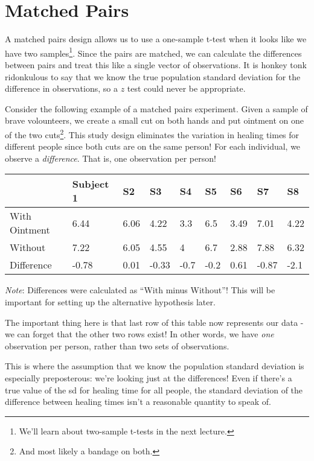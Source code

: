 \documentclass[
  letterpaper,
  DIV=11,
  numbers=noendperiod]{scrreprt}
\begin{document}
\hypertarget{matched-pairs}{%
\section{Matched Pairs}\label{matched-pairs}}

A matched pairs design allows us to use a one-sample t-test when it
looks like we have two samples\footnote{We'll learn about two-sample
  t-tests in the next lecture.}. Since the pairs are matched, we can
calculate the differences between pairs and treat this like a single
vector of observations. It is honkey tonk ridonkulous to say that we
know the true population standard deviation for the difference in
observations, so a \(z\) test could never be appropriate.

Consider the following example of a matched pairs experiment. Given a
sample of brave volounteers, we create a small cut on both hands and put
ointment on one of the two cuts\footnote{And most likely a bandage on
  both.}. This study design eliminates the variation in healing times
for different people since both cuts are on the same person! For each
individual, we observe a \emph{difference}. That is, one observation per
person!

\begin{longtable}[]{@{}lllllllll@{}}
\toprule\noalign{}
& Subject 1 & S2 & S3 & S4 & S5 & S6 & S7 & S8 \\
\midrule\noalign{}
\endhead
\bottomrule\noalign{}
\endlastfoot
With Ointment & 6.44 & 6.06 & 4.22 & 3.3 & 6.5 & 3.49 & 7.01 & 4.22 \\
Without & 7.22 & 6.05 & 4.55 & 4 & 6.7 & 2.88 & 7.88 & 6.32 \\
Difference & -0.78 & 0.01 & -0.33 & -0.7 & -0.2 & 0.61 & -0.87 & -2.1 \\
\end{longtable}

\emph{Note}: Differences were calculated as ``With minus Without''! This
will be important for setting up the alternative hypothesis later.

The important thing here is that last row of this table now represents
our data - we can forget that the other two rows exist! In other words,
we have \emph{one} observation per person, rather than two sets of
observations.

This is where the assumption that we know the population standard
deviation is especially preposterous: we're looking just at the
differences! Even if there's a true value of the sd for healing time for
all people, the standard deviation of the difference between healing
times isn't a reasonable quantity to speak of.
\end{document}
